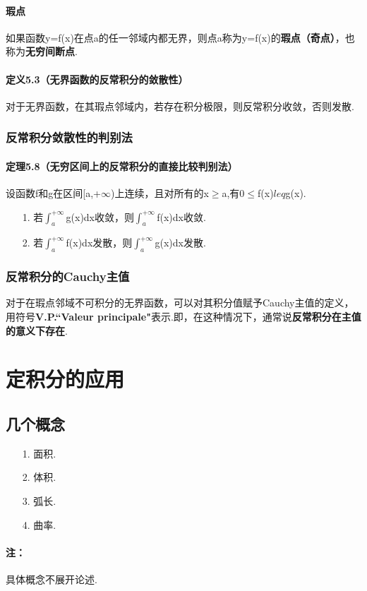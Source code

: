 \documentclass[12pt, a4paper, oneside]{ctexart}
\begin{document}
\paragraph{瑕点}如果函数y=f(x)在点a的任一邻域内都无界，则点a称为y=f(x)的\textbf{瑕点（奇点）}，也称为\textbf{无穷间断点}.
\paragraph{定义5.3（无界函数的反常积分的敛散性）}对于无界函数，在其瑕点邻域内，若存在积分极限，则反常积分收敛，否则发散.
\subsubsection{反常积分敛散性的判别法}
\paragraph{定理5.8（无穷区间上的反常积分的直接比较判别法）}设函数f和g在区间[a,+$\infty$)上连续，且对所有的x$\geq $a,有0$\leq $f(x)$leq $g(x).
\begin{enumerate}
	\item [1.]若$\int _{a}^{+\infty}$g(x)dx收敛，则$\int _{a}^{+\infty }$f(x)dx收敛.
	\item [2.]若$\int _{a}^{+\infty}$f(x)dx发散，则$\int _{a}^{+\infty }$g(x)dx发散.
\end{enumerate}

\subsubsection{反常积分的Cauchy主值}
对于在瑕点邻域不可积分的无界函数，可以对其积分值赋予Cauchy主值的定义，用符号\textbf{V.P.“Valeur principale"}表示.即，在这种情况下，通常说\textbf{反常积分在主值的意义下存在}.

\section{定积分的应用}
\subsection{几个概念}
\begin{enumerate}
	\item [1.]面积.
	\item [2.]体积.
	\item [3.]弧长.
	\item [4.]曲率.
\end{enumerate}
\paragraph{注：}具体概念不展开论述.
\end{document}
